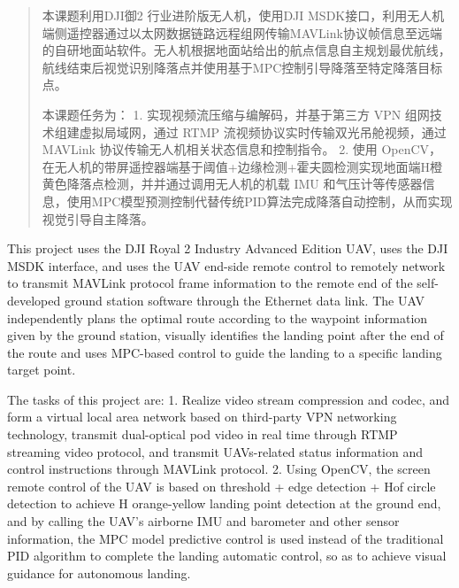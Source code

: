 \begin{abstract}
  本课题利用DJI御2 行业进阶版无人机，使用DJI MSDK接口，利用无人机端侧遥控器通过以太网数据链路远程组网传输MAVLink协议帧信息至远端的自研地面站软件。无人机根据地面站给出的航点信息自主规划最优航线，航线结束后视觉识别降落点并使用基于MPC控制引导降落至特定降落目标点。
  
  本课题任务为：
  1. 实现视频流压缩与编解码，并基于第三方 VPN 组网技术组建虚拟局域网，通过 RTMP 流视频协议实时传输双光吊舱视频，通过 MAVLink 协议传输无人机相关状态信息和控制指令。
  2. 使用 OpenCV，在无人机的带屏遥控器端基于阈值+边缘检测+霍夫圆检测实现地面端H橙黄色降落点检测，并并通过调用无人机的机载 IMU 和气压计等传感器信息，使用MPC模型预测控制代替传统PID算法完成降落自动控制，从而实现视觉引导自主降落。
\end{abstract}

\begin{enabstract}
  This project uses the DJI Royal 2 Industry Advanced Edition UAV, uses the DJI MSDK interface, and uses the UAV end-side remote control to remotely network to transmit MAVLink protocol frame information to the remote end of the self-developed ground station software through the Ethernet data link. The UAV independently plans the optimal route according to the waypoint information given by the ground station, visually identifies the landing point after the end of the route and uses MPC-based control to guide the landing to a specific landing target point.
  
  The tasks of this project are:
  1. Realize video stream compression and codec, and form a virtual local area network based on third-party VPN networking technology, transmit dual-optical pod video in real time through RTMP streaming video protocol, and transmit UAVs-related status information and control instructions through MAVLink protocol.
  2. Using OpenCV, the screen remote control of the UAV is based on threshold + edge detection + Hof circle detection to achieve H orange-yellow landing point detection at the ground end, and by calling the UAV's airborne IMU and barometer and other sensor information, the MPC model predictive control is used instead of the traditional PID algorithm to complete the landing automatic control, so as to achieve visual guidance for autonomous landing.
\end{enabstract}
